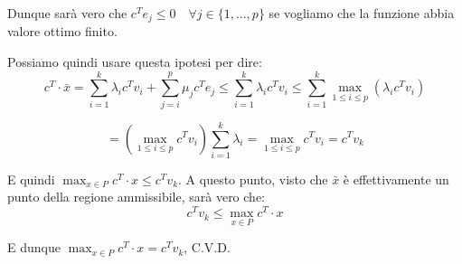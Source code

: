 \documentclass[a4paper,11pt]{article}
\begin{document}
Dunque sarà vero che $c^T e_j \leq 0 \quad \forall j \in \{ 1, ..., p \}$ se vogliamo che la funzione abbia valore ottimo finito.

Possiamo quindi usare questa ipotesi per dire:
$$
c^T \cdot \bar{x} = \sum_{i=1}^k \lambda_i c^T v_i + \sum_{j=i}^p \mu_j c^T e_j \leq \sum_{i=1}^k \lambda_i c^T v_i \leq \sum_{i=1}^k \max_{1 \leq i \leq p} \left(\lambda_i c^T v_i\right) 
$$

$$
= \left( \max_{1 \leq i \leq p} c^T v_i\right) \sum_{i=1}^k \lambda_i = \max_{1\leq i \leq p} c^Tv_i = c^T v_k
$$

E quindi $\max_{x \in P} c^T \cdot x \leq c^T v_k$.
A questo punto, visto che $\bar{x}$ è effettivamente un punto della regione ammissibile, sarà vero che:
$$
c^Tv_k \leq \max_{x \in P} c^T \cdot x
$$

E dunque $\max_{x \in P} c^T \cdot x = c^T v_k$, C.V.D.
\end{document}
